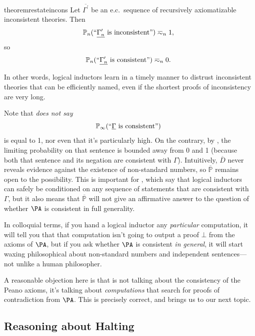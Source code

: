 \documentclass[authordate,onecolumn,noenvironments]{miri-tech-article}
\numberwithin{equation}{subsection}
\newcommand{\quot}[1]{``#1"}
\newcommand{\enc}[1]{{\underline{#1}}}
\newcommand{\seq}[1]{{\overline{#1}}}
\newcommand{\nn}{n}
\newcommand{\ec}[1][\ ]{e.c.#1}
\newcommand{\rparenthetical}[1]{\hfill\upshape{{\small (#1)}}} %
\newcommand{\proofin}[1]{\rparenthetical{Proof in:~#1.}}
\newcommand{\BelState}{\mathbb{P}}
\newcommand{\pt}{\BelState}
\newcommand{\MP}{\seq{\pt}}
\newcommand{\dt}{D}
\newcommand{\DP}{\seq{\dt}}
\newcommand{\Theory}{\Gamma}
\begin{document}
\begin{restatable}{theorem}{restateincons}\label{thm:incons}
  Let $\seq{\Theory^\prime}$ be an \ec sequence of recursively axiomatizable inconsistent theories. Then
  \[
    \pt_\nn(\quot{\enc{\Theory^\prime_\nn}\textnormal{\ is inconsistent}}) \eqsim_\nn 1,
  \]
  so
  \[
    \pt_\nn(\quot{\enc{\Theory^\prime_\nn}\textnormal{\ is consistent}}) \eqsim_\nn 0.
  \]
  \proofin{\ref{app:incons}}
\end{restatable}

\noindent In other words, logical inductors learn in a timely manner to distrust inconsistent theories that can be efficiently named, even if the shortest proofs of inconsistency are very long.

Note that  \emph{does not say}
\[
  \pt_\infty(\quot{\enc{\Theory}\textnormal{ is consistent}})
\]
is equal to 1, nor even that it's particularly high. On the contrary, by , the limiting probability on that sentence is bounded away from 0 and 1 (because both that sentence and its negation are consistent with $\Theory$). Intuitively, $\DP$ never reveals evidence against the existence of non-standard numbers, so $\MP$ remains open to the possibility. This is important for , which say that logical inductors can safely be conditioned on any sequence of statements that are consistent with $\Theory$, but it also means that $\MP$ will not give an affirmative answer to the question of whether $\PA$ is consistent in full generality.

In colloquial terms, if you hand a logical inductor any \emph{particular} computation, it will tell you that that computation isn't going to output a proof $\bot$ from the axioms of $\PA$, but if you ask whether $\PA$ is consistent \emph{in general}, it will start waxing philosophical about non-standard numbers and independent sentences---not unlike a human philosopher.

A reasonable objection here is that  is not talking about the consistency of the Peano axioms, it's talking about \emph{computations} that search for proofs of contradiction from $\PA$. This is precisely correct, and brings us to our next topic.



\subsection{Reasoning about Halting}\label{sec:halting}
\end{document}
